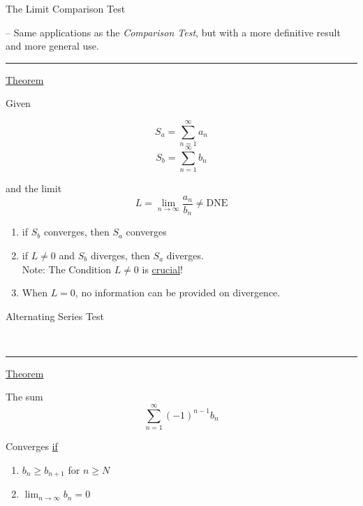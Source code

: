 \documentclass{article}
\begin{document}
\begin{large}
    The Limit Comparison Test
\end{large} -- Same applications as the \textit{Comparison Test}, but with a more definitive result\\\indent\hspace{2.13in} and more general use.\\
\noindent\rule{\textwidth}{0.5pt}
\begin{center}
    \underline{Theorem}

\begin{multicols}{2}\noindent
    Given
    \begin{multicols}{2}\noindent
    \[
         S_a = \sum_{n = 1}^\infty{a_n}
    \]
    \[
         S_b = \sum_{n = 1}^\infty{b_n}
    \]
    \end{multicols}
    and the limit
    \medskip
    \[
        L = \lim_{n \to \infty}{\frac{a_n}{b_n}} \neq \textrm{DNE}
    \]
    
    \vfill\null\columnbreak

    \begin{enumerate}
        \item if $S_b$ converges, then $S_a$ converges
        \item if \underline{$L \neq 0$} and $S_b$ diverges, then $S_a$ diverges.\\\medskip
        \indent Note: The Condition $L \neq 0$ is \underline{crucial}! 
        \item When $L = 0$, no information can be provided on divergence.
    \end{enumerate}

\end{multicols}
\end{center}

\begin{large}
    Alternating Series Test
\end{large}\\
\noindent\rule{\textwidth}{0.5pt}

\begin{center}
\underline{Theorem}

\begin{multicols}{2}\noindent
    
    The sum
    \[
        \sum_{n = 1}^\infty{(-1)^{n-1}b_n}
    \]
    
    
    \vfill\null\columnbreak

    Converges \underline{if}
    \begin{enumerate}
        \item $b_n \geq b_{n+1}$ for $n \geq N$
        \item $\lim_{n \to \infty}{b_n} = 0$
    \end{enumerate}
    \end{multicols}
\end{center}
\end{document}

